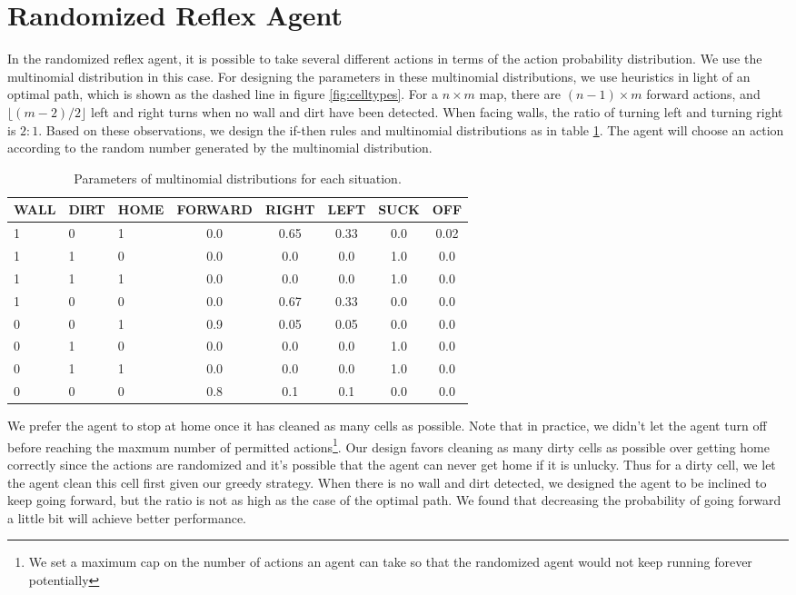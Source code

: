 \section{Randomized Reflex Agent}
In the randomized reflex agent, it is possible to take several different actions in terms of the action probability distribution. We use the multinomial distribution in this case. For designing the parameters in these multinomial distributions, we use heuristics in light of an optimal path, which is shown as the dashed line in figure \ref{fig:celltypes}. For a $n \times m$ map, there are $(n-1) \times m$ forward actions, and $\lfloor (m-2)/2 \rfloor$ left and right turns when no wall and dirt have
been detected. When facing walls, the ratio of turning left and turning right is $2:1$. Based on these observations, we design the if-then rules and multinomial distributions as in table \ref{tab:random}. The agent will choose an action according to the random number generated by the multinomial distribution.

\begin{table}[h]
    \centering
    \begin{tabular}{|l|l|l|c|c|c|c|c|}
        \hline
        WALL & DIRT & HOME & FORWARD & RIGHT & LEFT & SUCK & OFF  \\ \hline
        1    & 0    & 1    & 0.0     & 0.65  & 0.33 & 0.0  & 0.02 \\ 
        1    & 1    & 0    & 0.0     & 0.0   & 0.0  & 1.0  & 0.0  \\ 
        1    & 1    & 1    & 0.0     & 0.0   & 0.0  & 1.0  & 0.0  \\ 
        1    & 0    & 0    & 0.0     & 0.67  & 0.33 & 0.0  & 0.0  \\ 
        0    & 0    & 1    & 0.9     & 0.05  & 0.05 & 0.0  & 0.0  \\ 
        0    & 1    & 0    & 0.0     & 0.0   & 0.0  & 1.0  & 0.0  \\ 
        0    & 1    & 1    & 0.0     & 0.0   & 0.0  & 1.0  & 0.0  \\ 
        0    & 0    & 0    & 0.8     & 0.1   & 0.1  & 0.0  & 0.0  \\
        \hline
    \end{tabular}
    \caption{Parameters of multinomial distributions for each situation.}\label{tab:random}
\end{table}

We prefer the agent to stop at home once it has cleaned as many cells as possible. Note that in practice, we didn't let the agent turn off before reaching the maxmum number of permitted actions\footnote{We set a maximum cap on the number of actions an agent can take so that the randomized agent would not keep running forever potentially}. Our design favors cleaning as many dirty cells as possible over getting home correctly since the actions are randomized and it's possible that the agent can never get home if it is unlucky.  Thus for a dirty cell, we let the agent clean this cell first given our greedy strategy. When there is no wall and dirt detected, we designed the agent to be inclined to keep going forward, but the ratio is not as high as the case of the optimal path. We found
that decreasing the probability of going forward a little bit will achieve better performance.
